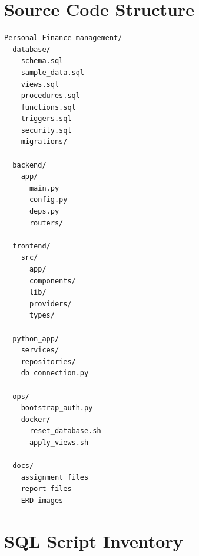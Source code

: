 ﻿\documentclass{article}
\begin{document}
\section{Source Code Structure}
\label{appendix:source-code-structure}
\begin{lstlisting}[style=codestyle, caption={Project source code structure}]
Personal-Finance-management/
  database/
    schema.sql
    sample_data.sql
    views.sql
    procedures.sql
    functions.sql
    triggers.sql
    security.sql
    migrations/

  backend/
    app/
      main.py
      config.py
      deps.py
      routers/

  frontend/
    src/
      app/
      components/
      lib/
      providers/
      types/

  python_app/
    services/
    repositories/
    db_connection.py

  ops/
    bootstrap_auth.py
    docker/
      reset_database.sh
      apply_views.sh

  docs/
    assignment files
    report files
    ERD images
\end{lstlisting}

\section{SQL Script Inventory}
\label{appendix:sql-script-inventory}
\small
\renewcommand{\arraystretch}{1.2}
\end{document}

